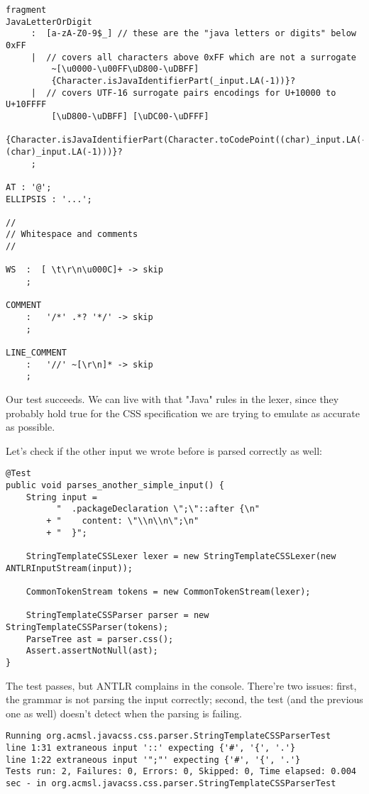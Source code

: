 \documentclass[11pt]{article}
\begin{document}
\begin{verbatim}
fragment
JavaLetterOrDigit
     :	[a-zA-Z0-9$_] // these are the "java letters or digits" below 0xFF
     |	// covers all characters above 0xFF which are not a surrogate
   	     ~[\u0000-\u00FF\uD800-\uDBFF]
   	     {Character.isJavaIdentifierPart(_input.LA(-1))}?
     |	// covers UTF-16 surrogate pairs encodings for U+10000 to U+10FFFF
   	     [\uD800-\uDBFF] [\uDC00-\uDFFF]
   	     {Character.isJavaIdentifierPart(Character.toCodePoint((char)_input.LA(-2), (char)_input.LA(-1)))}?
     ;

AT : '@';
ELLIPSIS : '...';

//
// Whitespace and comments
//

WS  :  [ \t\r\n\u000C]+ -> skip
    ;

COMMENT
    :   '/*' .*? '*/' -> skip
    ;

LINE_COMMENT
    :   '//' ~[\r\n]* -> skip
    ;
\end{verbatim}

Our test succeeds. We can live with that "Java" rules in the lexer, since they probably hold true for the CSS
specification we are trying to emulate as accurate as possible.

Let's check if the other input we wrote before is parsed correctly as well:

\begin{verbatim}
@Test
public void parses_another_simple_input() {
    String input =
          "  .packageDeclaration \";\"::after {\n"
        + "    content: \"\\n\\n\";\n"
        + "  }";

    StringTemplateCSSLexer lexer = new StringTemplateCSSLexer(new ANTLRInputStream(input));

    CommonTokenStream tokens = new CommonTokenStream(lexer);

    StringTemplateCSSParser parser = new StringTemplateCSSParser(tokens);
    ParseTree ast = parser.css();
    Assert.assertNotNull(ast);
}
\end{verbatim}

The test passes, but ANTLR complains in the console. There're two issues: first, the grammar is not parsing the input correctly; second, the test (and the previous one as well) doesn't
detect when the parsing is failing.

\begin{verbatim}
Running org.acmsl.javacss.css.parser.StringTemplateCSSParserTest
line 1:31 extraneous input '::' expecting {'#', '{', '.'}
line 1:22 extraneous input '";"' expecting {'#', '{', '.'}
Tests run: 2, Failures: 0, Errors: 0, Skipped: 0, Time elapsed: 0.004 sec - in org.acmsl.javacss.css.parser.StringTemplateCSSParserTest
\end{verbatim}
\end{document}

